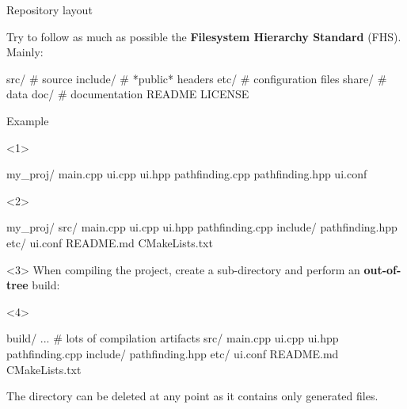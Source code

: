 \documentclass[compress]{beamer}
\begin{document}
\begin{frame}[fragile]{Repository layout}

Try to follow as much as possible the {\bf Filesystem Hierarchy
 Standard} (FHS). Mainly:

\begin{shcode}
src/        # source
include/    # *public* headers
etc/        # configuration files
share/      # data
doc/        # documentation
README
LICENSE
\end{shcode}

\centering


\end{frame}

\begin{frame}[fragile]{Example}

\begin{onlyenv}<1>
\begin{shcode}
my_proj/
  main.cpp
  ui.cpp
  ui.hpp
  pathfinding.cpp
  pathfinding.hpp
  ui.conf
\end{shcode}

\end{onlyenv}

\begin{onlyenv}<2>
\begin{shcode}
my_proj/
  src/
    main.cpp
    ui.cpp
    ui.hpp
    pathfinding.cpp
  include/
    pathfinding.hpp
  etc/
    ui.conf
  README.md
  CMakeLists.txt
\end{shcode}

\end{onlyenv}

\begin{onlyenv}<3>
When compiling the project, create a sub-directory  and perform an
    \textbf{out-of-tree} build:


\end{onlyenv}

\begin{onlyenv}<4>

\begin{shcode}
build/
  ... # lots of compilation artifacts
src/
  main.cpp
  ui.cpp
  ui.hpp
  pathfinding.cpp
include/
  pathfinding.hpp
etc/
  ui.conf
README.md
CMakeLists.txt
\end{shcode}

    The  directory can be deleted at any point as it contains only
    generated files.
\end{onlyenv}
\end{frame}
\end{document}
